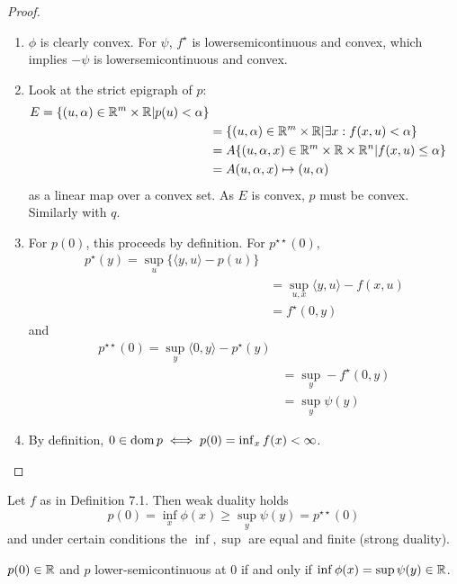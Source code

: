\begin{proof}
  \begin{enumerate}
  \item $\phi$ is clearly convex.  For $\psi$, $f^{\star}$ is
    lowersemicontinuous and convex, which implies $-\psi$ is
    lowersemicontinuous and convex.
  \item Look at the strict epigraph of $p$:
    \begin{align}
      \label{eq:73}
      E = \{ (u, \alpha) \in \mathbb{R}^{m} \times \mathbb{R} | p(u) < \alpha \} \\
      &= \{ (u, \alpha) \in \mathbb{R}^{m} \times \mathbb{R} | \exists x : f(x, u) <
      \alpha \} \\
      &= A \{ (u, \alpha, x) \in \mathbb{R}^{m} \times \mathbb{R} \times \mathbb{R}^{n} | f(x,
      u) \leq \alpha \} \\
      &= A(u, \alpha, x) \mapsto (u, \alpha)
    \end{align} as a linear map over a convex set.  As $E$ is convex,
    $p$ must be convex.  Similarly with $q$.
  \item For $p(0)$, this proceeds by definition.  For $p^{\star
      \star}(0)$, 
    \begin{align}
      \label{eq:74}
      p^{\star}(y) = \sup_{u} \{ \langle y, u \rangle - p(u) \} \\
      &= \sup_{u, x} \langle y, u \rangle - f(x, u) \\
      &= f^{\star}(0, y)
    \end{align} and
    \begin{align}
      \label{eq:75}
      p^{\star \star}(0) = \sup_{y} \langle 0, y \rangle -
      p^{\star}(y) \\
      &= \sup_{y} - f^{\star}(0, y) \\
      &= \sup_{y} \psi(y)
    \end{align}
  \item By definition, $0 \in \operatorname*{dom} p \iff p(0) = \inf_{x} f(x) < \infty$.
  \end{enumerate}

\end{proof}

\begin{thm}
  \label{defn:conjugate_functions:11}
  Let $f$ as in Definition 7.1.  Then weak duality holds
  \begin{equation}
    \label{eq:60}
    p(0) = \inf_{x} \phi(x) \geq \sup_{y} \psi(y) = p^{\star \star}(0)
  \end{equation}
  and under certain conditions the $\inf, \sup$ are equal and finite
  (strong duality).

  $p(0) \in \mathbb{R}$ and $p$ lower-semicontinuous at 0 if and only if $\inf
  \phi(x) = \sup \psi(y) \in \mathbb{R}$.
\end{thm}

